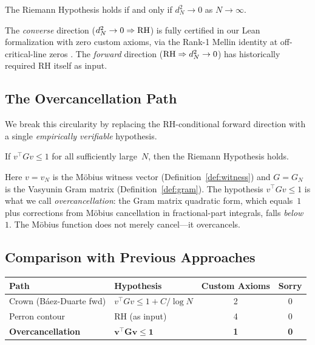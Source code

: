 \documentclass[11pt,a4paper]{article}
\begin{document}
\begin{theorem}
The Riemann Hypothesis holds if and only if $d_N^2 \to 0$ as
$N \to \infty$.
\end{theorem}

The \emph{converse} direction ($d_N^2 \to 0 \Rightarrow \mathrm{RH}$) is
fully certified in our Lean formalization with zero custom axioms,
via the Rank-1 Mellin identity at off-critical-line zeros
\cite{cathedral-main}. The \emph{forward} direction
($\mathrm{RH} \Rightarrow d_N^2 \to 0$) has historically required RH
itself as input.

\subsection{The Overcancellation Path}

We break this circularity by replacing the RH-conditional forward
direction with a single \emph{empirically verifiable} hypothesis.

\begin{theorem}
\label{thm:main}
If\/ $v^\top G v \leq 1$ for all sufficiently large~$N$, then the
Riemann Hypothesis holds.
\end{theorem}

Here $v = v_N$ is the M\"obius witness vector (Definition~\ref{def:witness})
and $G = G_N$ is the Vasyunin Gram matrix
(Definition~\ref{def:gram}). The hypothesis $v^\top G v \leq 1$ is
what we call \emph{overcancellation}: the Gram matrix quadratic form,
which equals~$1$ plus corrections from M\"obius cancellation in
fractional-part integrals, falls \emph{below}~$1$. The M\"obius
function does not merely cancel---it overcancels.

\subsection{Comparison with Previous Approaches}

\begin{center}
\begin{tabular}{@{}llcc@{}}
\toprule
\textbf{Path} & \textbf{Hypothesis} & \textbf{Custom Axioms} & \textbf{Sorry} \\
\midrule
Crown (B\'aez-Duarte fwd) & $v^\top G v \leq 1 + C/\log N$ & 2 & 0 \\
Perron contour & RH (as input) & 4 & 0 \\
\textbf{Overcancellation} & $\boldsymbol{v^\top G v \leq 1}$ & \textbf{1} & \textbf{0} \\
\bottomrule
\end{tabular}
\end{center}
\end{document}
